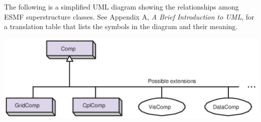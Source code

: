 The following is a simplified UML diagram showing the relationships among
ESMF superstructure classes.  See Appendix A, {\it A Brief 
Introduction to UML},
for a translation table that lists the symbols in the diagram and their 
meaning.

\begin{center}
\includegraphics{Comp_obj.eps}   
\end{center}



